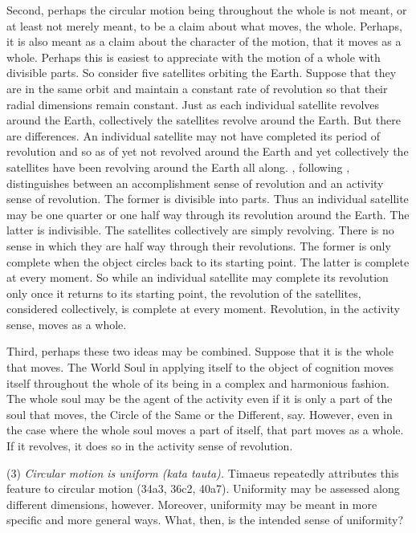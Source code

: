 Second, perhaps the circular motion being throughout the whole is not meant, or at least not merely meant, to be a claim about what moves, the whole. Perhaps, it is also meant as a claim about the character of the motion, that it moves as a whole. Perhaps this is easiest to appreciate with the motion of a whole with divisible parts. So consider five satellites orbiting the Earth. Suppose that they are in the same orbit and maintain a constant rate of revolution so that their radial dimensions remain constant. Just as each individual satellite revolves around the Earth, collectively the satellites revolve around the Earth. But there are differences. An individual satellite may not have completed its period of revolution and so as of yet not revolved around the Earth and yet collectively the satellites have been revolving around the Earth all along. \citet{Lee:1976xs}, following \citet{Vendler:1967ab}, distinguishes between an accomplishment sense of revolution and an activity sense of revolution. The former is divisible into parts. Thus an individual satellite may be one quarter or one half way through its revolution around the Earth. The latter is indivisible. The satellites collectively are simply revolving. There is no sense in which they are half way through their revolutions. The former is only complete when the object circles back to its starting point. The latter is complete at every moment. So while an individual satellite may complete its revolution only once it returns to its starting point, the revolution of the satellites, considered collectively, is complete at every moment. Revolution, in the activity sense, moves as a whole.

Third, perhaps these two ideas may be combined. Suppose that it is the whole that moves. The World Soul in applying itself to the object of cognition moves itself throughout the whole of its being in a complex and harmonious fashion. The whole soul may be the agent of the activity even if it is only a part of the soul that moves, the Circle of the Same or the Different, say. However, even in the case where the whole soul moves a part of itself, that part moves as a whole. If it revolves, it does so in the activity sense of revolution. 


(3) \emph{Circular motion is uniform (\emph{kata tauta}).} Timaeus repeatedly attributes this feature to circular motion (34a3, 36c2, 40a7). Uniformity may be assessed along different dimensions, however. Moreover, uniformity may be meant in more specific and more general ways. What, then, is the intended sense of uniformity? 

